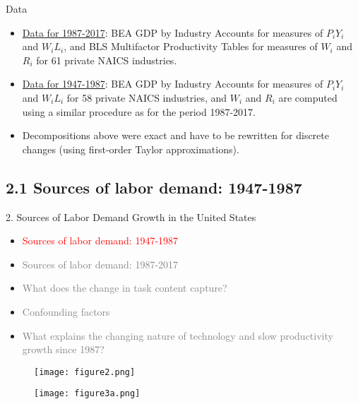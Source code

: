 \documentclass[notes=show]{beamer}
\begin{document}
\begin{frame}{Data}
\begin{itemize}
\item \underline{Data for 1987-2017}: BEA GDP by Industry Accounts for measures of $P_{i}Y_{i}$ and $W_{i}L_{i}$, and BLS Multifactor Productivity Tables for measures of $W_{i}$ and $R_{i}$ for 61 private NAICS industries. \medskip
\item \underline{Data for 1947-1987}: BEA GDP by Industry Accounts for measures of $P_{i}Y_{i}$ and $W_{i}L_{i}$ for 58 private NAICS industries, and $W_{i}$ and $R_{i}$ are computed using a similar procedure as for the period 1987-2017. \medskip
\item Decompositions above were exact and have to be rewritten for discrete changes (using first-order Taylor approximations).
\end{itemize}
\end{frame}

\subsection{2.1 Sources of labor demand: 1947-1987}

\begin{frame}{2. Sources of Labor Demand Growth in the United States}
\begin{itemize}
\item[\textcolor{red}{2.1}] \textcolor{red}{Sources of labor demand: 1947-1987} \medskip
\item[\textcolor{gray}{2.2}] \textcolor{gray}{Sources of labor demand: 1987-2017} \medskip
\item[\textcolor{gray}{2.3}] \textcolor{gray}{What does the change in task content capture?} \medskip
\item[\textcolor{gray}{2.4}] \textcolor{gray}{Confounding factors} \medskip
\item[\textcolor{gray}{2.5}] \textcolor{gray}{What explains the changing nature of technology and slow productivity growth since 1987?} 
\end{itemize}
\end{frame}

\newpage
\begin{center}
\begin{figure}
\texttt{[image: figure2.png]}
\end{figure} 
\end{center}
\newpage

\newpage
\begin{center}
\begin{figure}
\texttt{[image: figure3a.png]}
\end{figure} 
\end{center}
\newpage
\end{document}
